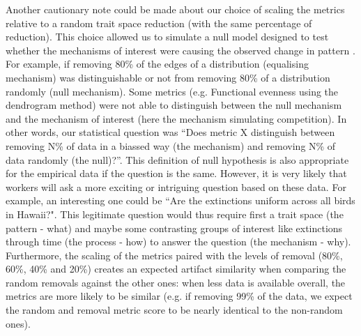 \documentclass[12pt,letterpaper]{article}
\begin{document}
Another cautionary note could be made about our choice of scaling the metrics relative to a random trait space reduction (with the same percentage of reduction).
This choice allowed us to simulate a null model designed to test whether the mechanisms of interest were causing the observed change in pattern \citep{bausman2018modeling}.
For example, if removing 80\% of the edges of a distribution (equalising mechanism) was distinguishable or not from removing 80\% of a distribution randomly (null mechanism).
Some metrics (e.g. Functional evenness using the dendrogram method) were not able to distinguish between the null mechanism and the mechanism of interest (here the mechanism simulating competition).
In other words, our statistical question was ``Does metric X distinguish between removing N\% of data in a biassed way (the mechanism) and removing N\% of data randomly (the null)?''.
This definition of null hypothesis is also appropriate for the empirical data if the question is the same.
However, it is very likely that workers will ask a more exciting or intriguing question based on these data.
For example, an interesting one could be ``Are the extinctions uniform across all birds in Hawaii?".
This legitimate question would thus require first a trait space (the pattern - what) and maybe some contrasting groups of interest like extinctions through time (the process - how) to answer the question (the mechanism - why). %
Furthermore, the scaling of the metrics paired with the levels of removal (80\%, 60\%, 40\% and 20\%) creates an expected artifact similarity when comparing the random removals against the other ones: when less data is available overall, the metrics are more likely to be similar (e.g. if removing 99\% of the data, we expect the random and removal metric score to be nearly identical to the non-random ones).
\end{document}
